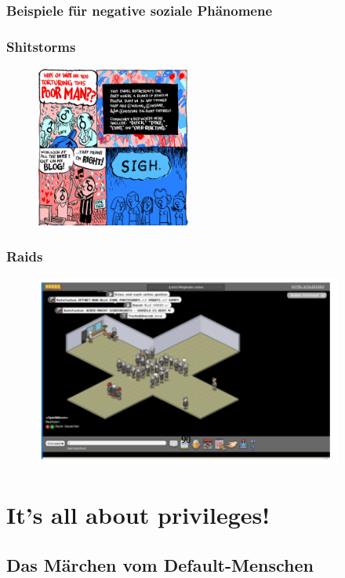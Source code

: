 \documentclass{beamer}
\begin{document}
\subsubsection{Beispiele für negative soziale Phänomene}
\frame
{
  \frametitle{Shitstorms}
  \begin{figure}[p] %
     \centering
     \includegraphics[width=2in]{shitstorm.png} 
  \end{figure}
}
\frame
{
  \frametitle{Raids}
  \begin{figure}[p] %
     \centering
     \includegraphics[width=4in]{raid.png} 
  \end{figure}
}

\section{It's all about privileges!}
\subsection{Das Märchen vom Default-Menschen}
\end{document}
